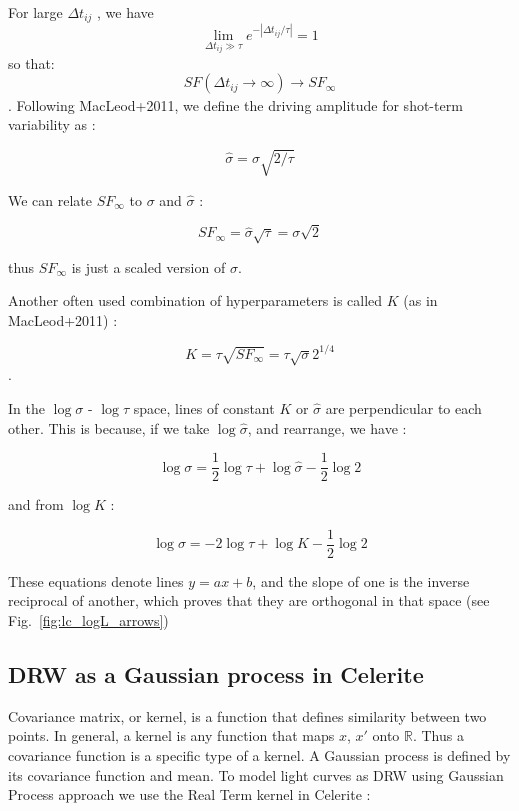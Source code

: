 \documentclass[fleqn,usenatbib]{mnras}  %
\begin{document}
For large $\Delta t_{ij} $ , we have    
\[ \lim_{\Delta t_{ij} \gg \tau} e^{-|\Delta t_{ij} /\tau| }= 1 \]
so that: \[   SF(\Delta t_{ij} \to \infty)\xrightarrow[]{} SF_{\infty} \].  Following MacLeod+2011,  we define the driving amplitude for shot-term variability as :

\begin{equation}
\hat{\sigma} = \sigma \sqrt{2 / \tau}
\end{equation} 

We can relate $SF_{\infty}$ to $\sigma$ and $\hat{\sigma}$ : 

\begin{equation}
SF_{\infty} = \hat{\sigma} \sqrt{\tau} = \sigma \sqrt{2}
\end{equation} 

thus $SF_{\infty}$ is just a scaled version of $\sigma$. 

Another often used combination of hyperparameters is called $K$ (as in MacLeod+2011) : 

\begin{equation}
K = \tau \sqrt{SF_{\infty} }= \tau \sqrt{\sigma} 2^{1/4} 
\end{equation}.  

In the $\log{\sigma}$ - $\log{\tau}$ space, lines of constant $K$ or $\hat{\sigma}$ are perpendicular to each other.  This is because, if we take $\log{\hat{\sigma}}$, and rearrange, we have  : 

\begin{equation}
\log{\sigma} = \frac{1}{2} \log{\tau} + \log{\hat{\sigma}} - \frac{1}{2} \log{2}
\label{eq:sigma_hat_line}
\end{equation}

and from  $\log{K}$ : 

\begin{equation}
\log{\sigma} = -2 \log{\tau} + \log{K} - \frac{1}{2} \log{2}
\label{eq:K_line}
\end{equation}

These equations denote lines $y = ax + b$,  and the slope of one is the  inverse reciprocal of another, which proves that they are orthogonal in that space (see Fig.~\ref{fig:lc_logL_arrows})

\subsection{DRW as a Gaussian process in Celerite}
Covariance matrix, or kernel, is a function that defines similarity between two points. In general, a kernel is any function that maps $x$, $x'$ onto $\mathbb{R}$. Thus a covariance function is a specific type of a kernel.   A Gaussian process is defined by its covariance function and mean. To model light curves as DRW using Gaussian Process approach we use the Real Term kernel in Celerite : 
\end{document}
